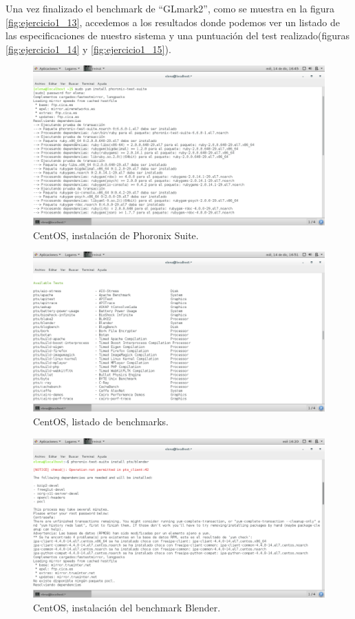 Una vez finalizado el benchmark de ``GLmark2'', como se muestra en la figura \ref{fig:ejercicio1_13}, accedemos a los resultados donde podemos ver un listado de las especificaciones de nuestro sistema y una puntuación del test realizado(figuras \ref{fig:ejercicio1_14} y \ref{fig:ejercicio1_15}).



\begin{figure}[H] 
	\centering
	\includegraphics[width=14.7cm]{./img/ejercicio1_1.png} 	
	\caption{CentOS, instalación de Phoronix Suite.} \label{fig:ejercicio1_1}
\end{figure}

\begin{figure}[H] 
	\centering
	\includegraphics[width=14.7cm]{./img/ejercicio1_2.png} 	
	\caption{CentOS, listado de benchmarks.} \label{fig:ejercicio1_2}
\end{figure}

\begin{figure}[H] 
	\centering
	\includegraphics[width=14.7cm]{./img/ejercicio1_3.png} 	
	\caption{CentOS, instalación del benchmark Blender.} \label{fig:ejercicio1_3}
\end{figure}

